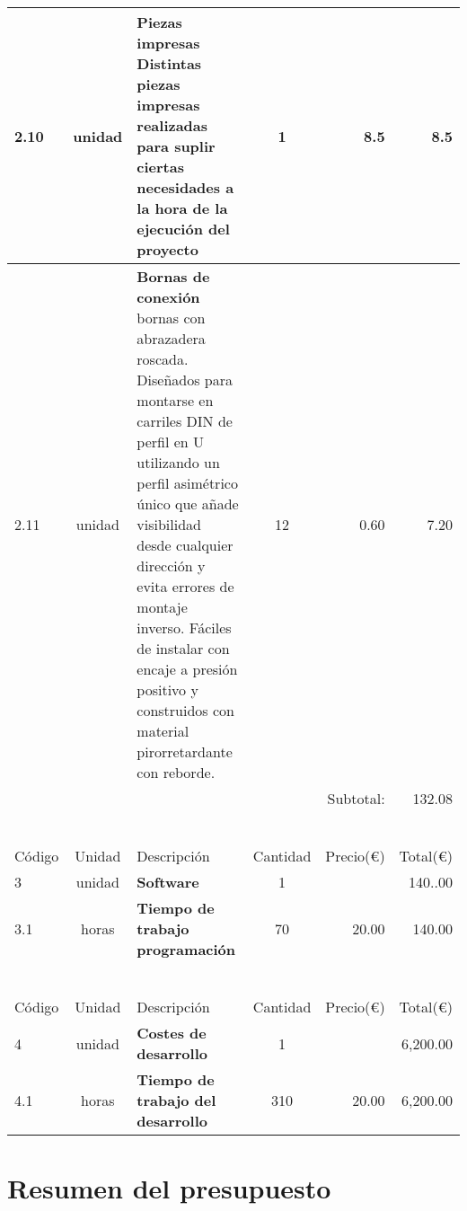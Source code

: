 \begin{longtable}{l c p{7cm} c r r}
    2.10 & unidad & \textbf{Piezas impresas} \newline \small Distintas piezas impresas realizadas para suplir ciertas necesidades a la hora de la ejecución del proyecto & 1 & 8.5 & 8.5\\ \hline
  
    2.11 & unidad & \textbf{Bornas de conexión} \newline \small bornas con abrazadera roscada. Diseñados para montarse en carriles DIN de perfil en U utilizando un perfil asimétrico único que añade visibilidad desde cualquier dirección y evita errores de montaje inverso. Fáciles de instalar con encaje a presión positivo y construidos con material pirorretardante con reborde. & 12 & 0.60 & 7.20  \\ \hline
    
    &&&& Subtotal: &132.08\\

     \\~\\  \hline
     \pagebreak
    Código & Unidad & Descripción  & Cantidad & Precio(\euro) & Total(\euro)  \\ \hline \hline \hline \hline
    3 & unidad & \textbf{Software} & 1 & \multicolumn{1}{r}{} & 140..00 \\ \hline
    3.1 & horas & \textbf{Tiempo de trabajo programación} & 70 & 20.00 & 140.00 \\ \hline  
    
    \\~\\ \hline
    
    Código & Unidad & Descripción  & Cantidad & Precio(\euro) & Total(\euro)  \\ \hline \hline \hline \hline
    4 & unidad & \textbf{Costes de desarrollo} & 1 & \multicolumn{1}{r}{} & 6,200.00 \\ \hline
    4.1 & horas & \textbf{Tiempo de trabajo del desarrollo} & 310 & 20.00 & 6,200.00 \\ \hline  
   
\end{longtable}

\newpage
\section{Resumen del presupuesto}

